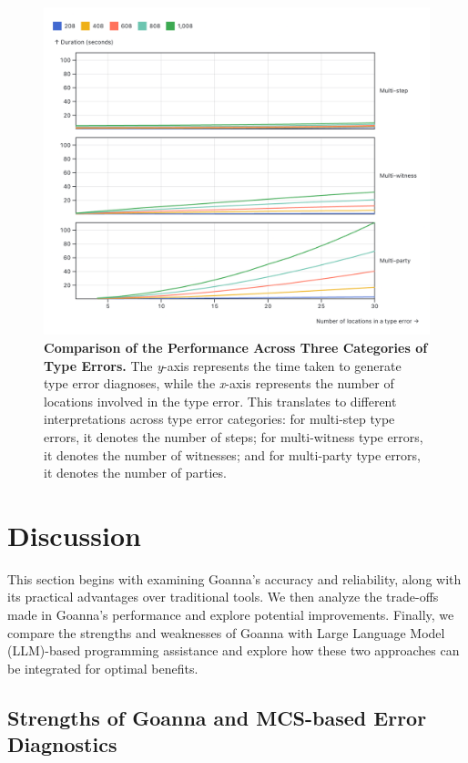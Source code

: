 \documentclass[pdflatex,lineno,sn-nature,Numbered]{sn-jnl}%
\begin{document}
\begin{figure}[ht]
    \centering
    \includegraphics[width=\linewidth]{images/compare-time.png}
    \caption{{\bf Comparison of the Performance Across Three Categories of Type Errors.} The {\it y}-axis represents the time taken to generate type error diagnoses, while the {\it x}-axis represents the number of locations involved in the type error. This translates to different interpretations across type error categories: for multi-step type errors, it denotes the number of steps; for multi-witness type errors, it denotes the number of witnesses; and for multi-party type errors, it denotes the number of parties.}
    \label{fig:compare-time}
\end{figure}


\section{Discussion} \label{sec:discussion}

This section begins with examining Goanna's accuracy and reliability, along with its practical advantages over traditional tools. We then analyze the trade-offs made in Goanna's performance and explore potential improvements. Finally, we compare the strengths and weaknesses of Goanna with Large Language Model (LLM)-based programming assistance and explore how these two approaches can be integrated for optimal benefits.

\subsection{Strengths of Goanna and MCS-based Error Diagnostics}
\end{document}
